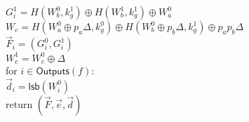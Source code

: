\begin{protocol}[Garble]
	\indent \indent \indent $G_i^1 = H(W_b^0, k_g^1) \oplus H(W_b^1, k_g^1) \oplus W_a^0$ \\
	\indent \indent \indent $W_c = H(W_a^0 \oplus p_a \Delta, k_g^0) \oplus H(W_b^0 \oplus p_b \Delta, k_g^1) \oplus p_a p_b \Delta$ \\
	\indent \indent \indent  $\vec{F}_i = (G_i^0, G_i^1)$ \\
	\indent \indent  $W_c^1 = W_c^0 \oplus \Delta$ \\
	\indent for $i \in \textsf{Outputs}(f)$:\\
	\indent \indent  $\vec{d}_i = \textsf{lsb}(W_i^0)$ \\
	\indent return $(\vec{F}, \vec{e}, \vec{d})$ \\
%	
\end{protocol}